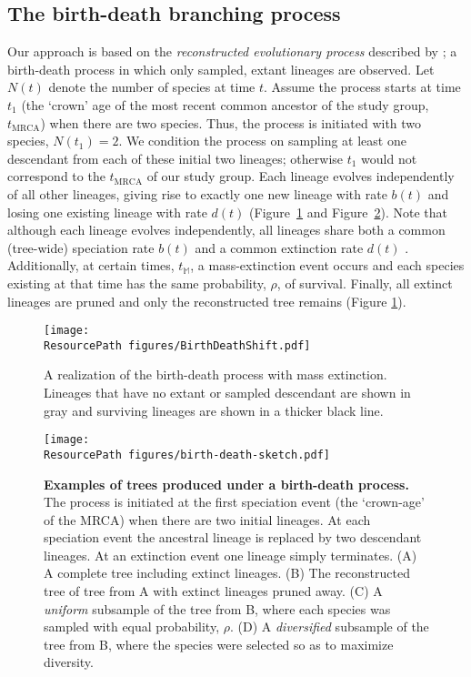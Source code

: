 \subsection{The birth-death branching process}
Our approach is based on the \textit{reconstructed evolutionary process} described by \cite{Nee1994b}; a birth-death process in which only sampled, extant lineages are observed.
Let $N(t)$ denote the number of species at time $t$.
Assume the process starts at time $t_1$ (the `crown' age of the most recent common ancestor of the study group, $t_\text{MRCA}$) when there are two species.
Thus, the process is initiated with two species, $N(t_1) = 2$.
We condition the process on sampling at least one descendant from each of these initial two lineages; otherwise $t_1$ would not correspond to the $t_\text{MRCA}$ of our study group.
Each lineage evolves independently of all other lineages, giving rise to exactly one new lineage with rate $b(t)$ and losing one existing lineage with rate $d(t)$ (Figure~\ref{fig:BirthDeathShift} and Figure~\ref{fig:BDP}).
Note that although each lineage evolves independently, all lineages share both a common (tree-wide) speciation rate $b(t)$ and a common extinction rate $d(t)$ \citep{Nee1994b,Hoehna2015a}.
Additionally, at certain times, $t_{\mathbb{M}}$, a mass-extinction event occurs and each species existing at that time has the same probability, $\rho$, of survival.
Finally, all extinct lineages are pruned and only the reconstructed tree remains (Figure \ref{fig:BirthDeathShift}).

\begin{figure}[h]
\centering
       \texttt{[image: \\ResourcePath figures/BirthDeathShift.pdf]}
   \caption{A realization of the  birth-death process with mass extinction.
   Lineages that have no extant or sampled descendant are shown in gray and surviving lineages are shown in a thicker black line.}
\label{fig:BirthDeathShift}
\end{figure}

\begin{figure}[!htbp]
  	\begin{center}
  		\texttt{[image: \\ResourcePath figures/birth-death-sketch.pdf]}
		\caption{
		{\bf Examples of trees produced under a birth-death process.}
		The process is initiated at the first speciation event (the `crown-age' of the MRCA) when there are two initial lineages.
		At each speciation event the ancestral lineage is replaced by two descendant lineages.
		At an extinction event one lineage simply terminates.
		(A) A complete tree including extinct lineages.
		(B) The reconstructed tree of tree from A with extinct lineages pruned away.
		(C) A \emph{uniform} subsample of the tree from B, where each species was sampled with equal probability, $\rho$.
		(D) A \emph{diversified} subsample of the tree from B, where the species were selected so as to maximize diversity.}
	\label{fig:BDP}
  	\end{center}
\end{figure}

